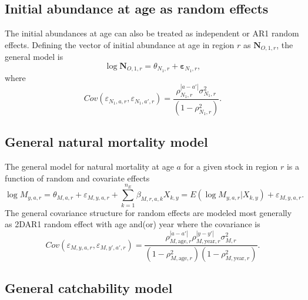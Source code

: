 \documentclass[
]{article}
\begin{document}
\hypertarget{initial-abundance-at-age-as-random-effects}{%
\subsection*{Initial abundance at age as random effects}\label{initial-abundance-at-age-as-random-effects}}

The initial abundances at age can also be treated as independent or AR1 random effects. Defining the vector of initial abundance at age in region \(r\) as \(\mathbf{N}_{O,1,r}\), the general model is
\begin{equation*}
\log \mathbf{N}_{O,1,r} = \theta_{N_1,r} + \boldsymbol{\varepsilon}_{N_1,r},
\end{equation*}
where
\begin{equation*}
Cov\left(\varepsilon_{N_1,a,r},\varepsilon_{N_1,a',r}\right) = \frac{\rho_{N_1,r}^{|a-a'|}\sigma^2_{N_1,r}} {\left(1-\rho_{N_1,r}^2\right)}.
\end{equation*}

\hypertarget{general-natural-mortality-model}{%
\subsection*{General natural mortality model}\label{general-natural-mortality-model}}

The general model for natural mortality at age \(a\) for a given stock in region \(r\) is a function of random and covariate effects
\begin{equation}\label{eq:M_model}
  \log M_{y,a,r} = \theta_{M,a,r} + \varepsilon_{M,y,a,r} + \sum^{n_E}_{k=1} \beta_{M,r,a,k} X_{k,y} = E\left(\log M_{y,a,r}|X_{k,y}\right) + \varepsilon_{M,y,a,r}.
\end{equation}
The general covariance structure for random effects are modeled most generally as 2DAR1 random effect with age and(or) year where the covariance is
\begin{equation*}
  Cov\left(\varepsilon_{M,y,a,r},\varepsilon_{M,y',a',r}\right) =   \frac{\rho_{M,\text{age},r}^{|a-a'|}\rho_{M,\text{year},r}^{|y-y'|}\sigma^2_{M,r}}{\left(1 -  \rho_{M,\text{age},r}^2\right)\left(1 - \rho_{M,\text{year},r}^2\right)}.
\end{equation*}

\hypertarget{general-catchability-model}{%
\subsection*{General catchability model}\label{general-catchability-model}}
\end{document}
